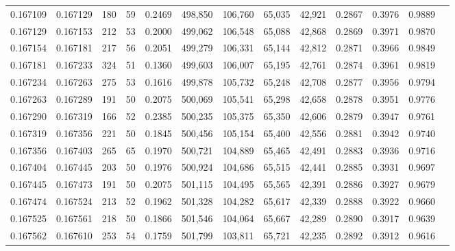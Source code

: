 \begin{tabular}{rrrrrrrrrrrrr}
0.167109 & 0.167129 &   180 &  59 &                                     0.2469 & 498,850 & 106,760 &  65,035 &  42,921 & 0.2867 & 0.3976 & 0.9889 \\
0.167129 & 0.167153 &   212 &  53 &                                     0.2000 & 499,062 & 106,548 &  65,088 &  42,868 & 0.2869 & 0.3971 & 0.9870 \\
0.167154 & 0.167181 &   217 &  56 &                                     0.2051 & 499,279 & 106,331 &  65,144 &  42,812 & 0.2871 & 0.3966 & 0.9849 \\
0.167181 & 0.167233 &   324 &  51 &                                     0.1360 & 499,603 & 106,007 &  65,195 &  42,761 & 0.2874 & 0.3961 & 0.9819 \\
0.167234 & 0.167263 &   275 &  53 &                                     0.1616 & 499,878 & 105,732 &  65,248 &  42,708 & 0.2877 & 0.3956 & 0.9794 \\
0.167263 & 0.167289 &   191 &  50 &                                     0.2075 & 500,069 & 105,541 &  65,298 &  42,658 & 0.2878 & 0.3951 & 0.9776 \\
0.167290 & 0.167319 &   166 &  52 &                                     0.2385 & 500,235 & 105,375 &  65,350 &  42,606 & 0.2879 & 0.3947 & 0.9761 \\
0.167319 & 0.167356 &   221 &  50 &                                     0.1845 & 500,456 & 105,154 &  65,400 &  42,556 & 0.2881 & 0.3942 & 0.9740 \\
0.167356 & 0.167403 &   265 &  65 &                                     0.1970 & 500,721 & 104,889 &  65,465 &  42,491 & 0.2883 & 0.3936 & 0.9716 \\
0.167404 & 0.167445 &   203 &  50 &                                     0.1976 & 500,924 & 104,686 &  65,515 &  42,441 & 0.2885 & 0.3931 & 0.9697 \\
0.167445 & 0.167473 &   191 &  50 &                                     0.2075 & 501,115 & 104,495 &  65,565 &  42,391 & 0.2886 & 0.3927 & 0.9679 \\
0.167474 & 0.167524 &   213 &  52 &                                     0.1962 & 501,328 & 104,282 &  65,617 &  42,339 & 0.2888 & 0.3922 & 0.9660 \\
0.167525 & 0.167561 &   218 &  50 &                                     0.1866 & 501,546 & 104,064 &  65,667 &  42,289 & 0.2890 & 0.3917 & 0.9639 \\
0.167562 & 0.167610 &   253 &  54 &                                     0.1759 & 501,799 & 103,811 &  65,721 &  42,235 & 0.2892 & 0.3912 & 0.9616 \\

\end{tabular}
